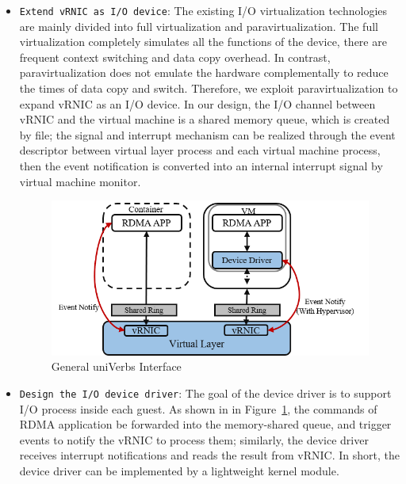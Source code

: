 \begin{itemize}
	\item {\verb|Extend vRNIC as I/O device|}: 
	The existing I/O virtualization technologies are mainly divided into full virtualization and paravirtualization. The full virtualization completely simulates all the functions of the device, there are frequent context switching and data copy overhead. 
	In contrast, paravirtualization does not emulate the hardware complementally to reduce the times of data copy and switch. Therefore, we exploit paravirtualization to expand vRNIC as an I/O device. In our design, the I/O channel between vRNIC and the virtual machine is a shared memory queue, which is created by file; the signal and interrupt mechanism can be realized through the event descriptor between virtual layer process and each virtual machine process, then the event notification is converted into an internal interrupt signal by virtual machine monitor.
	
	\begin{figure}[!ht]
		\centering
		\includegraphics[width=1.0\linewidth]{images/interface-general}
		\caption{General uniVerbs Interface}
		\label{fig:interface-general}
	\end{figure}
	
	
	\item {\verb|Design the I/O device driver|}:
	The goal of the device driver is to support I/O process inside each guest. As shown in in Figure~\ref{fig:interface-general},  the commands of RDMA application be forwarded into the memory-shared queue, and trigger events to notify the vRNIC to process them; similarly, the device driver receives interrupt notifications and reads the result from vRNIC. In short, the device driver can be implemented by a lightweight kernel module.
	
\end{itemize}

